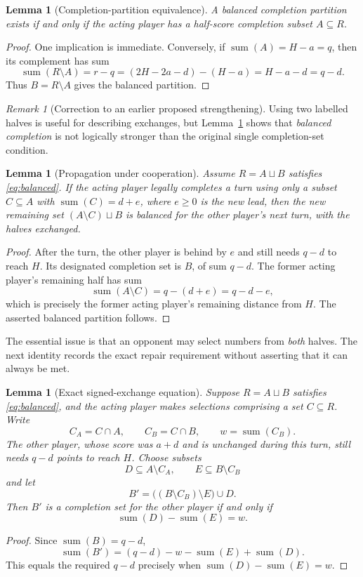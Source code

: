 \documentclass[11pt,a4paper]{article}
\newtheorem{lemma}[theorem]{Lemma}
\theoremstyle{definition}
\theoremstyle{remark}
\newtheorem{remark}[theorem]{Remark}
\newcommand{\sm}{\operatorname{sum}}
\begin{document}
\begin{lemma}[Completion-partition equivalence]
\label{lem:equiv}
A balanced completion partition exists if and only if the acting
player has a half-score completion subset $A\subseteq R$.
\end{lemma}
\begin{proof}
One implication is immediate.  Conversely, if $\sm(A)=H-a=q$,
then its complement has sum
\[
\sm(R\setminus A)=r-q
=(2H-2a-d)-(H-a)=H-a-d=q-d.
\]
Thus $B=R\setminus A$ gives the balanced partition.
\end{proof}

\begin{remark}[Correction to an earlier proposed strengthening]
Using two labelled halves is useful for describing exchanges, but
Lemma~\ref{lem:equiv} shows that \emph{balanced completion} is not
logically stronger than the original single completion-set condition.
\end{remark}

\begin{lemma}[Propagation under cooperation]
\label{lem:propagate}
Assume $R=A\sqcup B$ satisfies \eqref{eq:balanced}.  If the acting
player legally completes a turn using only a subset $C\subseteq A$
with $\sm(C)=d+e$, where $e\ge0$ is the new lead, then the new
remaining set $(A\setminus C)\sqcup B$ is balanced for the other
player's next turn, with the halves exchanged.
\end{lemma}
\begin{proof}
After the turn, the other player is behind by $e$ and still needs
$q-d$ to reach $H$.  Its designated completion set is $B$, of sum
$q-d$.  The former acting player's remaining half has sum
\[
\sm(A\setminus C)=q-(d+e)=q-d-e,
\]
which is precisely the former acting player's remaining distance
from $H$.  The asserted balanced partition follows.
\end{proof}

The essential issue is that an opponent may select numbers from
\emph{both} halves.  The next identity records the exact repair
requirement without asserting that it can always be met.

\begin{lemma}[Exact signed-exchange equation]
\label{lem:exchange}
Suppose $R=A\sqcup B$ satisfies \eqref{eq:balanced}, and the acting
player makes selections comprising a set $C\subseteq R$.  Write
\[
C_A=C\cap A,\qquad C_B=C\cap B,\qquad w=\sm(C_B).
\]
The other player, whose score was $a+d$ and is unchanged during this
turn, still needs $q-d$ points to reach $H$.  Choose subsets
\[
D\subseteq A\setminus C_A,\qquad
E\subseteq B\setminus C_B
\]
and let
\[
B'=\bigl((B\setminus C_B)\setminus E\bigr)\cup D.
\]
Then $B'$ is a completion set for the other player \emph{if and only if}
\begin{equation}\label{eq:exchange}
\boxed{\sm(D)-\sm(E)=w.}
\end{equation}
\end{lemma}
\begin{proof}
Since $\sm(B)=q-d$,
\[
\sm(B')=(q-d)-w-\sm(E)+\sm(D).
\]
This equals the required $q-d$ precisely when
$\sm(D)-\sm(E)=w$.
\end{proof}
\end{document}
